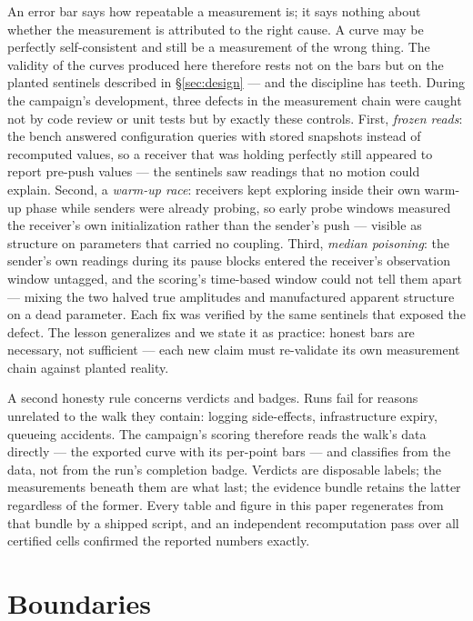 \documentclass[11pt,a4paper]{article}
\begin{document}
An error bar says how repeatable a measurement is; it says
nothing about whether the measurement is attributed to the right
cause. A curve may be perfectly self-consistent and still be a
measurement of the wrong thing. The validity of the curves produced
here therefore rests not on the bars but on the planted sentinels
described in \S\ref{sec:design} --- and the discipline has teeth.
During the campaign's development, three defects in the measurement
chain were caught not by code review or unit tests but by exactly
these controls. First, \emph{frozen reads}: the bench answered
configuration queries with stored snapshots instead of recomputed
values, so a receiver that was holding perfectly still appeared to
report pre-push values --- the sentinels saw readings that no
motion could explain. Second, a \emph{warm-up race}: receivers kept
exploring inside their own warm-up phase while senders were already
probing, so early probe windows measured the receiver's own
initialization rather than the sender's push --- visible as
structure on parameters that carried no coupling. Third,
\emph{median poisoning}: the sender's own readings during its pause
blocks entered the receiver's observation window untagged, and the
scoring's time-based window could not tell them apart --- mixing
the two halved true amplitudes and manufactured apparent structure
on a dead parameter. Each fix was verified by the same sentinels
that exposed the defect. The lesson generalizes and we state it as
practice: honest bars are necessary, not sufficient --- each new
claim must re-validate its own measurement chain against planted
reality.

A second honesty rule concerns verdicts and badges. Runs fail for
reasons unrelated to the walk they contain: logging side-effects,
infrastructure expiry, queueing accidents. The campaign's scoring
therefore reads the walk's data directly --- the exported curve with
its per-point bars --- and classifies from the data, not from the
run's completion badge. Verdicts are disposable labels; the measurements beneath them
are what last; the evidence bundle retains the latter regardless of
the former. Every table and figure in this paper regenerates from
that bundle by a shipped script, and an independent recomputation
pass over all certified cells confirmed the reported numbers exactly.

\section{Boundaries}
\label{sec:boundaries}
\end{document}
